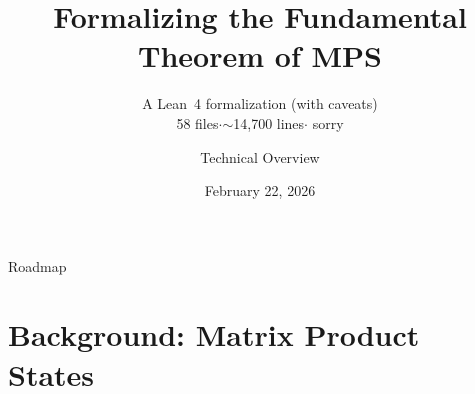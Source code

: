 \documentclass[aspectratio=169,10pt]{beamer}
\title{Formalizing the Fundamental Theorem of MPS}
\subtitle{\small A Lean~4 formalization (with caveats)\\[-2pt]
{\tiny 58 files\enspace$\cdot$\enspace${\sim}$14{,}700 lines\enspace$\cdot$\enspace 0 sorry}}
\date{February 22, 2026}
\author{Technical Overview}
\begin{document}
{%
\begin{frame}
    \vspace*{-0.5cm}
    \maketitle
\end{frame}
}

\begin{frame}{Roadmap}
    \tableofcontents
\end{frame}

\section{Background: Matrix Product States}
\end{document}
